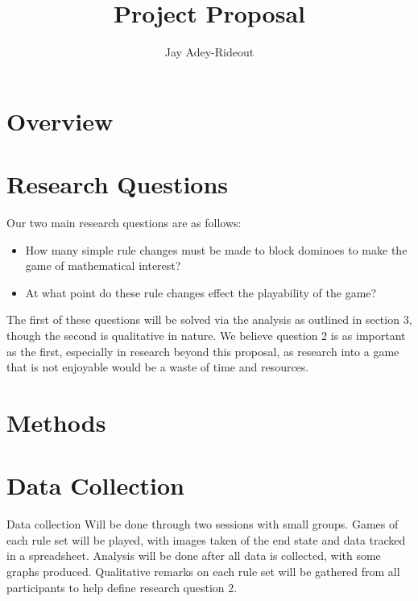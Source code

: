 \documentclass{article}
\title{Project Proposal}
\author{Jay Adey-Rideout}
\begin{document}
\maketitle

\section{Overview}
\section{Research Questions}
Our two main research questions are as follows:
\begin{itemize}
    \item How many simple rule changes must be made to block dominoes to make the game of mathematical interest?
    \item At what point do these rule changes effect the playability of the game?
\end{itemize}
The first of these questions will be solved via the analysis as outlined in section 3, though the second is qualitative in nature. We believe question 2 is as important as the first, especially in research beyond this proposal, as research into a game that is not enjoyable would be a waste of time and resources.
\section{Methods}
\section{Data Collection}
Data collection Will be done through two sessions with small groups. Games of each rule set will be played, with images taken of the end state and data tracked in a spreadsheet. Analysis will be done after all data is collected, with some graphs produced. Qualitative remarks on each rule set will be gathered from all participants to help define research question 2.





\end{document}
